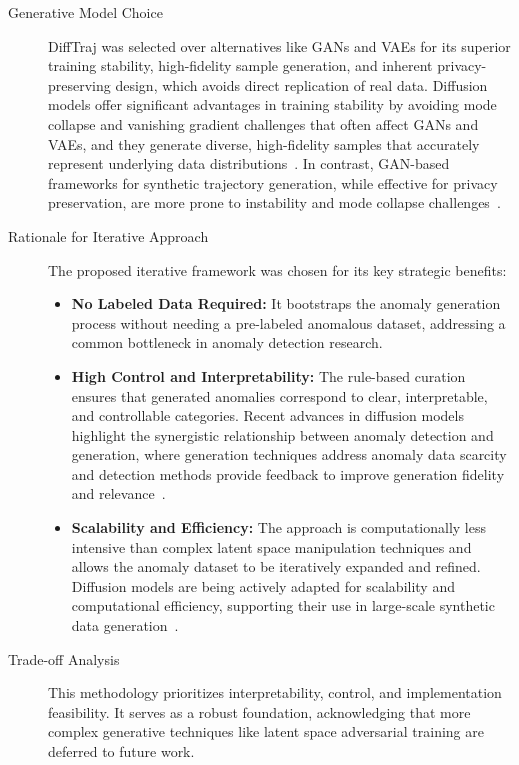 \documentclass[runningheads]{llncs}
\begin{document}
\begin{description}
    \item[Generative Model Choice] DiffTraj was selected over alternatives like GANs and VAEs for its superior training stability, high-fidelity sample generation, and inherent privacy-preserving design, which avoids direct replication of real data. Diffusion models offer significant advantages in training stability by avoiding mode collapse and vanishing gradient challenges that often affect GANs and VAEs, and they generate diverse, high-fidelity samples that accurately represent underlying data distributions~\cite{liuAnomalyDetectionGeneration2025}. In contrast, GAN-based frameworks for synthetic trajectory generation, while effective for privacy preservation, are more prone to instability and mode collapse challenges~\cite{caoGeneratingMobilityTrajectories2021}.
    \item[Rationale for Iterative Approach] The proposed iterative framework was chosen for its key strategic benefits:
        \begin{itemize}[leftmargin=*]
            \item \textbf{No Labeled Data Required:} It bootstraps the anomaly generation process without needing a pre-labeled anomalous dataset, addressing a common bottleneck in anomaly detection research.
            \item \textbf{High Control and Interpretability:} The rule-based curation ensures that generated anomalies correspond to clear, interpretable, and controllable categories. Recent advances in diffusion models highlight the synergistic relationship between anomaly detection and generation, where generation techniques address anomaly data scarcity and detection methods provide feedback to improve generation fidelity and relevance~\cite{liuAnomalyDetectionGeneration2025}.
            \item \textbf{Scalability and Efficiency:} The approach is computationally less intensive than complex latent space manipulation techniques and allows the anomaly dataset to be iteratively expanded and refined. Diffusion models are being actively adapted for scalability and computational efficiency, supporting their use in large-scale synthetic data generation~\cite{liuAnomalyDetectionGeneration2025}.
        \end{itemize}
    \item[Trade-off Analysis] This methodology prioritizes interpretability, control, and implementation feasibility. It serves as a robust foundation, acknowledging that more complex generative techniques like latent space adversarial training are deferred to future work.
\end{description}
\end{document}
